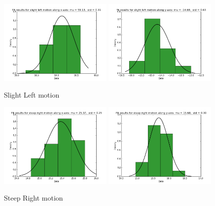 \documentclass[10pt]{scrartcl}
\begin{document}
\begin{figure}[H]
\centering
\caption{Slight Left motion}
\label{fig:13}
\includegraphics[width=0.49\textwidth ]{images/slight_left_x_data}
\includegraphics[width=0.49\textwidth]{images/slight_left_y_data}
\end{figure}

\begin{figure}[H]
\centering
\caption{Steep Right motion}
\label{fig:14}
\includegraphics[width=0.49\textwidth ]{images/steep_right_x_data}
\includegraphics[width=0.49\textwidth]{images/steep_right_y_data}
\end{figure}
\end{document}
